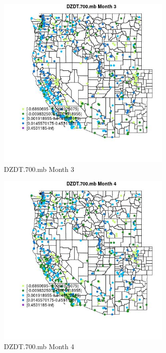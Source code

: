\begin{figure} 
\centering  
\includegraphics[width=0.77\textwidth]{Code_Outputs/Report_ML_input_PM25_Step4_part_e_de_duplicated_aves_compiled_2019-05-14wNAs_MapObsMo3DZDT700mb.jpg} 
\caption{\label{fig:Report_ML_input_PM25_Step4_part_e_de_duplicated_aves_compiled_2019-05-14wNAsMapObsMo3DZDT700mb}DZDT.700.mb Month 3} 
\end{figure} 
 

\clearpage 

\begin{figure} 
\centering  
\includegraphics[width=0.77\textwidth]{Code_Outputs/Report_ML_input_PM25_Step4_part_e_de_duplicated_aves_compiled_2019-05-14wNAs_MapObsMo4DZDT700mb.jpg} 
\caption{\label{fig:Report_ML_input_PM25_Step4_part_e_de_duplicated_aves_compiled_2019-05-14wNAsMapObsMo4DZDT700mb}DZDT.700.mb Month 4} 
\end{figure} 
 

